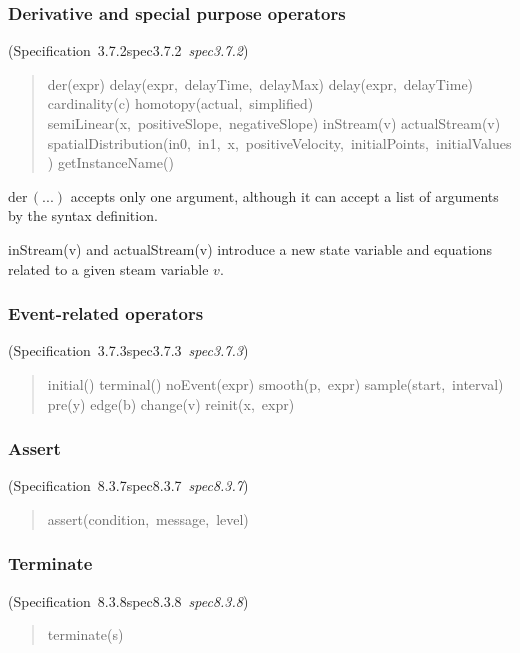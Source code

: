 \documentclass[10pt,b5paper]{article}
\def\specrefx#1#2{Specification~#1\ifx\relax#2\relax{}\else~{\it{}#2}\fi}
\def\specref#1{\specrefx{#1}{\csname spec#1\endcsname}}
\begin{document}
\subsubsection*{Derivative and special purpose operators}
(\specref{3.7.2}\/)

\begin{quote}\widespacing

der(expr)
delay(expr,~delayTime,~delayMax)
delay(expr,~delayTime)
cardinality(c)
homotopy(actual,~simplified)
semiLinear(x,~positiveSlope,~negativeSlope)
inStream(v)
actualStream(v)
spatialDistribution(in0,~in1,~x,~positiveVelocity,~initialPoints,~initialValues)
getInstanceName()

\end{quote}

\noindent $\mathrm{der}\,(...)$ accepts only one argument, although it
can accept a list of arguments by the syntax definition.

inStream(v) and actualStream(v) introduce a new state variable and
equations related to a given steam variable $v$.

\subsubsection*{Event-related operators}
(\specref{3.7.3}\/)

\begin{quote}\widespacing

initial()
terminal()
noEvent(expr)
smooth(p,~expr)
sample(start,~interval)
pre(y)
edge(b)
change(v)
reinit(x,~expr)

\end{quote}

\subsubsection*{Assert}
(\specref{8.3.7}\/)

\begin{quote}\widespacing

assert(condition,~message,~level)

\end{quote}

\subsubsection*{Terminate}
(\specref{8.3.8}\/)

\begin{quote}\widespacing

terminate(s)

\end{quote}
\end{document}
